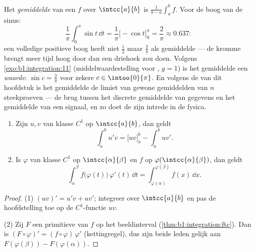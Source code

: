 \begin{example}\label{ex:b1:integration:average}
Het \emph{gemiddelde} van een  $f$ over $\intcc{a}{b}$ is
$\frac{1}{b-a}\int_a^b f$. Voor de boog van de sinus:
\[
\frac{1}{\pi}\int_0^\pi \sin t\,\dd t
= \frac{1}{\pi}\bigl[-\cos t\bigr]_0^\pi = \frac{2}{\pi}
\approx 0.637 :
\]
een volledige positieve boog heeft niet $\frac12$ maar
$\frac2\pi$ als gemiddelde --- de kromme brengt meer tijd hoog
door dan een driehoek zou doen. Volgens
\cref{exo:b1:integration:11} (middelwaardestelling voor
, $g = 1$) is het gemiddelde een \emph{waarde}: $\sin c
= \frac2\pi$ voor zekere $c \in \intoo{0}{\pi}$. En volgens de
 van dit hoofdstuk is het gemiddelde de limiet van
gewone gemiddelden van $n$ steekproeven --- de brug tussen het
discrete gemiddelde van gegevens en het  gemiddelde van
een signaal, en zo doet de  zijn intrede in de fysica.
\end{example}

\begin{theorem}\label{thm:b1:integration:parts}
\begin{enumerate}
  \item Zijn $u, v$ van klasse $C^1$ op $\intcc{a}{b}$, dan geldt
        \[
        \int_a^b u'v = \bigl[uv\bigr]_a^b - \int_a^b uv' .
        \]
  \item Is $\varphi$ van klasse $C^1$ op $\intcc{\alpha}{\beta}$ en
        $f$  op $\varphi(\intcc{\alpha}{\beta})$, dan geldt
        \[
        \int_{\alpha}^{\beta} f\bigl(\varphi(t)\bigr)\,\varphi'(t)\,
        \dd t = \int_{\varphi(\alpha)}^{\varphi(\beta)} f(x)\, \dd x .
        \]
\end{enumerate}
\end{theorem}

\begin{proof}
(1) $(uv)' = u'v + uv'$; integreer over $\intcc{a}{b}$ en pas de
hoofdstelling toe op de $C^1$-functie $uv$.

(2) Zij $F$ een primitieve van $f$ op het beeldinterval
(\cref{thm:b1:integration:ftc}). Dan is $(F \circ \varphi)' = (f
\circ \varphi)\,\varphi'$ (kettingregel), dus zijn beide leden
gelijk aan $F(\varphi(\beta)) - F(\varphi(\alpha))$.
\end{proof}

